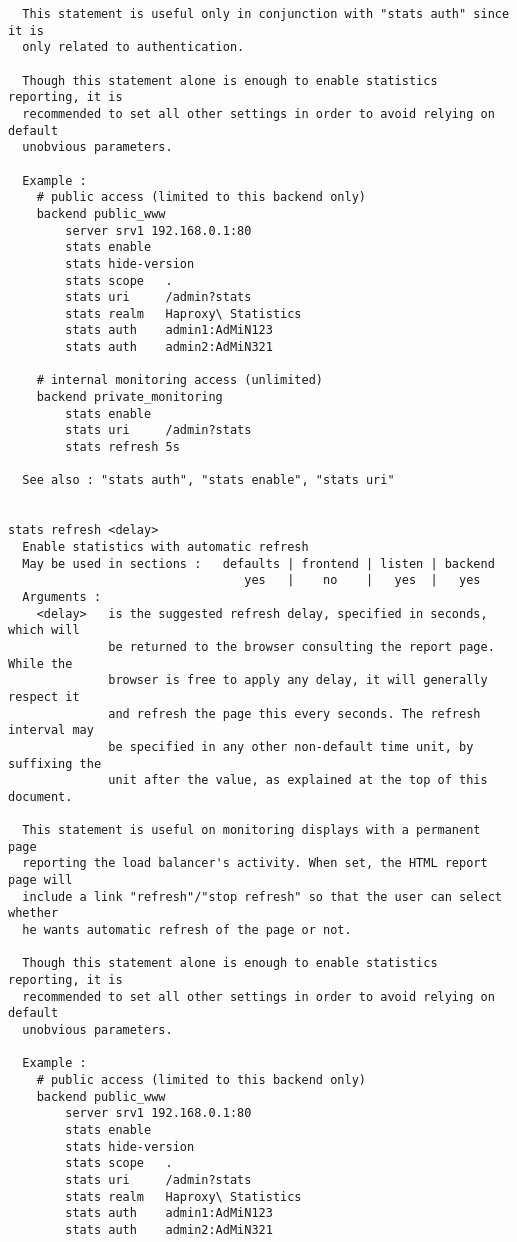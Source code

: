 \begin{verbatim}
  This statement is useful only in conjunction with "stats auth" since it is
  only related to authentication.

  Though this statement alone is enough to enable statistics reporting, it is
  recommended to set all other settings in order to avoid relying on default
  unobvious parameters.

  Example :
    # public access (limited to this backend only)
    backend public_www
        server srv1 192.168.0.1:80
        stats enable
        stats hide-version
        stats scope   .
        stats uri     /admin?stats
        stats realm   Haproxy\ Statistics
        stats auth    admin1:AdMiN123
        stats auth    admin2:AdMiN321

    # internal monitoring access (unlimited)
    backend private_monitoring
        stats enable
        stats uri     /admin?stats
        stats refresh 5s

  See also : "stats auth", "stats enable", "stats uri"


stats refresh <delay>
  Enable statistics with automatic refresh
  May be used in sections :   defaults | frontend | listen | backend
                                 yes   |    no    |   yes  |   yes
  Arguments :
    <delay>   is the suggested refresh delay, specified in seconds, which will
              be returned to the browser consulting the report page. While the
              browser is free to apply any delay, it will generally respect it
              and refresh the page this every seconds. The refresh interval may
              be specified in any other non-default time unit, by suffixing the
              unit after the value, as explained at the top of this document.

  This statement is useful on monitoring displays with a permanent page
  reporting the load balancer's activity. When set, the HTML report page will
  include a link "refresh"/"stop refresh" so that the user can select whether
  he wants automatic refresh of the page or not.

  Though this statement alone is enough to enable statistics reporting, it is
  recommended to set all other settings in order to avoid relying on default
  unobvious parameters.

  Example :
    # public access (limited to this backend only)
    backend public_www
        server srv1 192.168.0.1:80
        stats enable
        stats hide-version
        stats scope   .
        stats uri     /admin?stats
        stats realm   Haproxy\ Statistics
        stats auth    admin1:AdMiN123
        stats auth    admin2:AdMiN321


\end{verbatim}

